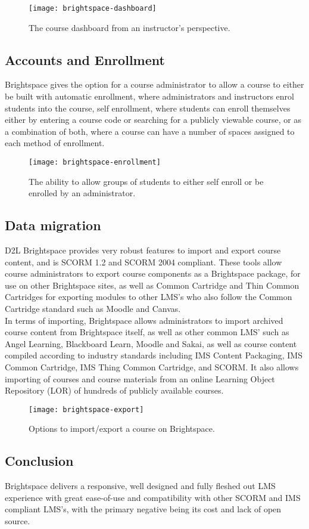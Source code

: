 \begin{figure}
\centering
\texttt{[image: brightspace-dashboard]}
\caption{The course dashboard from an instructor's perspective.}
\end{figure}

\subsection{Accounts and Enrollment}
Brightspace gives the option for a course administrator to allow a course to either be built with automatic enrollment, where administrators and instructors enrol students into the course, self enrollment, where students can enroll themselves either by entering a course code or searching for a publicly viewable course, or as a combination of both, where a course can have a number of spaces assigned to each method of enrollment.

\begin{figure}
\centering
\texttt{[image: brightspace-enrollment]}
\caption{The ability to allow groups of students to either self enroll or be enrolled by an administrator.}
\end{figure}

\subsection{Data migration}
D2L Brightspace provides very robust features to import and export course content, and is SCORM 1.2 and SCORM 2004 compliant. These tools allow course administrators to export course components as a Brightspace package, for use on other Brightspace sites, as well as Common Cartridge and Thin Common Cartridges for exporting modules to other LMS's who also follow the Common Cartridge standard such as Moodle and Canvas.\\
In terms of importing, Brightspace allows administrators to import archived course content from Brightspace itself, as well as other common LMS' such as Angel Learning, Blackboard Learn, Moodle and Sakai, as well as course content compiled according to industry standards including IMS Content Packaging, IMS Common Cartridge, IMS Thing Common Cartridge, and SCORM. It also allows importing of courses and course materials from an online Learning Object Repository (LOR) of hundreds of publicly available courses.\\

\begin{figure}
\centering
\texttt{[image: brightspace-export]}
\caption{Options to import/export a course on Brightspace.}
\end{figure}

\newpage

\subsection{Conclusion}
Brightspace delivers a responsive, well designed and fully fleshed out LMS experience with great ease-of-use and compatibility with other SCORM and IMS compliant LMS's, with the primary negative being its cost and lack of open source.